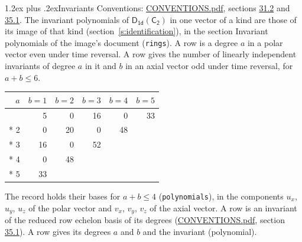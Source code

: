 \documentclass[10pt,a4paper]{article}
\makeatletter
\renewcommand\section{\@startsection{section}{1}{\z@}{-3ex plus -1ex minus -.2ex}%
  {1.2ex plus .2ex}{\normalfont\large\sffamily\bfseries\color{parttitle}}}
\numberwithin{equation}{section}
\newcommand{\grp}[1]{\mathsf{#1}}
\makeatother
\begin{document}
\section{Invariants}\label{s:invariants}
Conventions: \href{../../CONVENTIONS.pdf}{CONVENTIONS.pdf}, sections \href{../../CONVENTIONS.pdf\#conv.31.2}{31.2} and \href{../../CONVENTIONS.pdf\#conv.35.1}{35.1}.
The invariant polynomials of $\grp{D_{1d}}(\grp{C_{2}})$ in one vector of a kind are those of its image of that kind (section~\ref{s:identification}), in the section Invariant polynomials of the image's document (\texttt{rings}).
\leavevmode\label{n:index.degree.polar}\label{n:index.degree.axial}A row is a degree $a$ in a polar vector even under time reversal. A row gives the number of linearly independent invariants of degree $a$ in it and $b$ in an axial vector odd under time reversal, for $a + b \le 6$.
{\small\begin{longtable}{@{}rrrrrr@{}}\toprule
$a$ & $b = 1$ & $b = 2$ & $b = 3$ & $b = 4$ & $b = 5$\\\midrule\endhead
\bottomrule\endfoot\endlastfoot
1 & 5 & 0 & 16 & 0 & 33\\*
2 & 0 & 20 & 0 & 48 & \\*
3 & 16 & 0 & 52 &  & \\*
4 & 0 & 48 &  &  & \\*
5 & 33 &  &  &  & \\
\bottomrule\end{longtable}}
\leavevmode\label{n:local.component.polar}\label{n:local.component.axial}The record holds their bases for $a + b \le 4$ (\texttt{polynomials}), in the components $u_{x}$, $u_{y}$, $u_{z}$ of the polar vector and $v_{x}$, $v_{y}$, $v_{z}$ of the axial vector. \label{n:head.polynomial}A row is an invariant of the reduced row echelon basis of its degrees (\href{../../CONVENTIONS.pdf}{CONVENTIONS.pdf}, section \href{../../CONVENTIONS.pdf\#conv.35.1}{35.1}). A row gives its degrees $a$ and $b$ and the invariant (polynomial).
\end{document}
